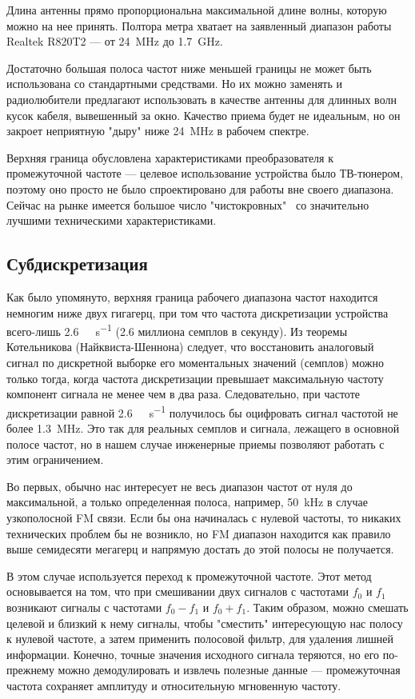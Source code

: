 Длина антенны прямо пропорциональна максимальной длине волны, которую можно на нее принять. Полтора метра хватает на заявленный диапазон работы Realtek R820T2 --- от \SI{24}{\mega\hertz} до \SI{1.7}{\giga\hertz}.

Достаточно большая полоса частот ниже меньшей границы не может быть использована со стандартными средствами. Но их можно заменять и радиолюбители предлагают использовать в качестве антенны для длинных волн кусок кабеля, вывешенный за окно. Качество приема будет не идеальным, но он закроет неприятную "дыру" ниже \SI{24}{\mega\hertz} в рабочем спектре.

Верхняя граница обусловлена характеристиками преобразователя к промежуточной частоте --- целевое использование устройства было ТВ-тюнером, поэтому оно просто не было спроектировано для работы вне своего диапазона. Сейчас на рынке имеется большое число "чистокровных" \SDR\ со значительно лучшими техническими характеристиками.


\subsection{Субдискретизация}

Как было упомянуто, верхняя граница рабочего диапазона частот находится немногим ниже двух гигагерц, при том что частота дискретизации устройства всего-лишь \SI{2.6}{\mega\sample\per\second} (\num{2.6} миллиона семплов в секунду). Из теоремы Котельникова (Найквиста-Шеннона) следует, что восстановить аналоговый сигнал по дискретной выборке его моментальных значений (семплов) можно только тогда, когда частота дискретизации превышает максимальную частоту компонент сигнала не менее чем в два раза. \cite{nyquist_wiki} Следовательно, при частоте дискретизации равной \SI{2.6}{\mega\sample\per\second} получилось бы оцифровать сигнал частотой не более \SI{1.3}{\mega\hertz}. Это так для реальных семплов и сигнала, лежащего в основной полосе частот, но в нашем случае инженерные приемы позволяют работать с этим ограничением.

Во первых, обычно нас интересует не весь диапазон частот от нуля до максимальной, а только определенная полоса, например, \SI{50}{\kilo\hertz} в случае узкополосной FM связи. Если бы она начиналась с нулевой частоты, то никаких технических проблем бы не возникло, но FM диапазон находится как правило выше семидесяти мегагерц и напрямую достать до этой полосы не получается.

В этом случае используется переход к промежуточной частоте. Этот метод основывается на том, что при смешивании двух сигналов с частотами $f_0$ и $f_1$ возникают сигналы с частотами $f_0 - f_1$ и $f_0 + f_1$. Таким образом, можно смешать целевой и близкий к нему сигналы, чтобы "сместить" интересующую нас полосу к нулевой частоте, а затем применить полосовой фильтр, для удаления лишней информации. Конечно, точные значения исходного сигнала теряются, но его по-прежнему можно демодулировать и извлечь полезные данные --- промежуточная частота сохраняет амплитуду и относительную мгновенную частоту.

